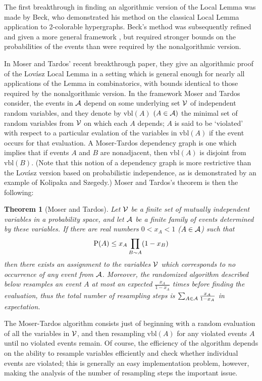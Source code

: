 \documentclass[letterpaper]{article}
\newcommand{\vbl}{\textrm{vbl}}
\newcommand{\pp}{{\rm P}}
\newcommand{\aaa}{{\cal A}}
\newcommand{\vvv}{{\cal V}}
\newtheorem{theorem}{Theorem}[section]
\theoremstyle{definition}
\theoremstyle{remark}
\begin{document}
The first breakthrough in finding an algorithmic version of the Local Lemma was made by Beck, who demonstrated his method on the classical Local Lemma application to 2-colorable hypergraphs.  Beck's method was subsequently refined and given a more general framework \cite{Alimp,MR,CS,S}, but required stronger bounds on the probabilities of the events than were required by the nonalgorithmic version.



In Moser and Tardos' recent breakthrough paper\cite{MT}, they give an algorithmic proof of the Lov\'asz Local Lemma in a setting which is general enough for nearly all applications of the Lemma in combinatorics, with bounds identical to those required by the nonalgorithmic version.  In the framework Moser and Tardos consider, the events in $\aaa$ depend on some underlying set $\vvv$ of independent random variables, and they denote by $\vbl(A)$ $(A\in \aaa)$ the minimal set of random variables from $\vvv$ on which each $A$ depends; $A$ is said to be `violated' with respect to a particular evalation of the variables in $\vbl(A)$ if the event occurs for that evaluation.  A Moser-Tardos dependency graph is one which implies that if events $A$ and $B$ are nonadjacent, then $\vbl(A)$ is disjoint from $\vbl(B)$.  (Note that this notion of a dependency graph is more restrictive than the Lov\'asz version based on probabilistic independence, as is demonstrated by an example of Kolipaka and Szegedy\cite{KS}.)   Moser and Tardos's theorem is then the following:
\begin{theorem}[Moser and Tardos]
  Let $\vvv$ be a finite set of mutually independent variables in a probability space, and let $\aaa$ be a finite family of events determined by these variables.  If there are real numbers $0<x_A<1$ ($A\in \aaa$) such that
\begin{equation}
\pp(A)\leq x_A\prod_{B\sim A}(1-x_B)
\label{c.MT}
\end{equation}
then there exists an assignment to the variables $\vvv$ which corresponds to no occurrence of any event from $\aaa$.  Moreover, the randomized algorithm described below resamples an event $A$ at most an expected $\frac{x_A}{1-x_A}$ times before finding the evaluation, thus the total number of resampling steps is $\sum_{A\in \aaa}\frac{x_A}{1-x_A}$ in expectation.
\end{theorem}
\noindent The Moser-Tardos algorithm consists just of beginning with a random evaluation of all the variables in $\vvv$, and then resampling $\vbl(A)$ for any violated events $A$ until no violated events remain.  Of course, the efficiency of the algorithm depends on the ability to resample variables efficiently and check whether individual events are violated; this is generally an easy implementation problem, however, making the analysis of the number of resampling steps the important issue.
\end{document}

